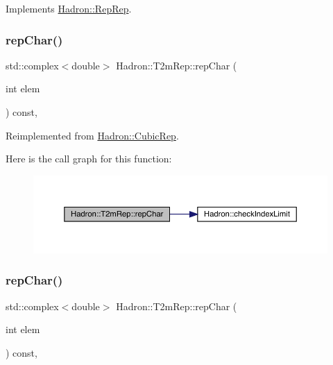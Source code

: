 Implements \mbox{\hyperlink{structHadron_1_1RepRep_ab3213025f6de249f7095892109575fde}{Hadron\+::\+Rep\+Rep}}.

\mbox{\label{structHadron_1_1T2mRep_af6775da2b681eda429dc3a5c026cc877}} 
\subsubsection{\texorpdfstring{repChar()}{repChar()}\hspace{0.1cm}{\footnotesize\ttfamily [1/3]}}
{\footnotesize\ttfamily std\+::complex$<$double$>$ Hadron\+::\+T2m\+Rep\+::rep\+Char (\begin{DoxyParamCaption}\item[{int}]{elem }\end{DoxyParamCaption}) const\hspace{0.3cm}{\ttfamily [inline]}, {\ttfamily [virtual]}}



Reimplemented from \mbox{\hyperlink{structHadron_1_1CubicRep_af45227106e8e715e84b0af69cd3b36f8}{Hadron\+::\+Cubic\+Rep}}.

Here is the call graph for this function\+:
\nopagebreak
\begin{figure}[H]
\begin{center}
\leavevmode
\includegraphics[width=350pt]{d7/dc8/structHadron_1_1T2mRep_af6775da2b681eda429dc3a5c026cc877_cgraph}
\end{center}
\end{figure}
\mbox{\label{structHadron_1_1T2mRep_af6775da2b681eda429dc3a5c026cc877}} 
\subsubsection{\texorpdfstring{repChar()}{repChar()}\hspace{0.1cm}{\footnotesize\ttfamily [2/3]}}
{\footnotesize\ttfamily std\+::complex$<$double$>$ Hadron\+::\+T2m\+Rep\+::rep\+Char (\begin{DoxyParamCaption}\item[{int}]{elem }\end{DoxyParamCaption}) const\hspace{0.3cm}{\ttfamily [inline]}, {\ttfamily [virtual]}}



